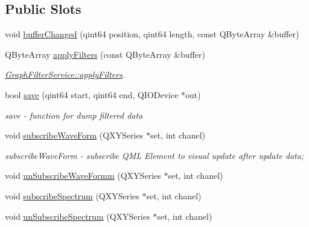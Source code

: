 \subsection*{Public Slots}
\begin{DoxyCompactItemize}
\item 
void \hyperlink{class_graph_filter_service_a0e7878bc2027bd8cb1480baf82783ed7}{buffer\+Changed} (qint64 position, qint64 length, const Q\+Byte\+Array \&buffer)
\item 
Q\+Byte\+Array \hyperlink{class_graph_filter_service_a399267e98d3977af552dfd0c0c39bac2}{apply\+Filters} (const Q\+Byte\+Array \&buffer)
\begin{DoxyCompactList}\small\item\em \hyperlink{class_graph_filter_service_a399267e98d3977af552dfd0c0c39bac2}{Graph\+Filter\+Service\+::apply\+Filters}. \end{DoxyCompactList}\item 
bool \hyperlink{class_graph_filter_service_a0ce26d46d68fd45bc4de9104e9b7a317}{save} (qint64 start, qint64 end, Q\+I\+O\+Device $\ast$out)
\begin{DoxyCompactList}\small\item\em save -\/ function for dump filtered data \end{DoxyCompactList}\item 
void \hyperlink{class_graph_filter_service_af02cad074674e6ff8030c2e8fc3be111}{subscribe\+Wave\+Form} (Q\+X\+Y\+Series $\ast$set, int chanel)
\begin{DoxyCompactList}\small\item\em subscribe\+Wave\+Form -\/ subscribe Q\+ML Element to visual update after update data; \end{DoxyCompactList}\item 
void \hyperlink{class_graph_filter_service_a710cfa42186e53b0ffbe9f34d57184a7}{un\+Subscribe\+Wave\+Formm} (Q\+X\+Y\+Series $\ast$set, int chanel)
\item 
void \hyperlink{class_graph_filter_service_a815f1067416248564e36f876d34c57d8}{subscribe\+Spectrum} (Q\+X\+Y\+Series $\ast$set, int chanel)
\item 
void \hyperlink{class_graph_filter_service_aae672b63fafe0403b7ae68844bbf90fa}{un\+Subscribe\+Spectrum} (Q\+X\+Y\+Series $\ast$set, int chanel)
\end{DoxyCompactItemize}
